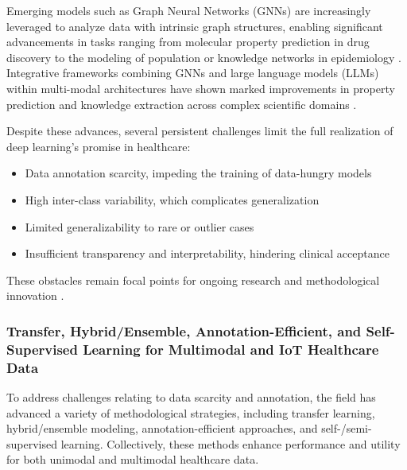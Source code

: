Emerging models such as Graph Neural Networks (GNNs) are increasingly leveraged to analyze data with intrinsic graph structures, enabling significant advancements in tasks ranging from molecular property prediction in drug discovery to the modeling of population or knowledge networks in epidemiology \cite{ref33, ref35, ref57}. Integrative frameworks combining GNNs and large language models (LLMs) within multi-modal architectures have shown marked improvements in property prediction and knowledge extraction across complex scientific domains \cite{ref33}.

Despite these advances, several persistent challenges limit the full realization of deep learning’s promise in healthcare:
\begin{itemize}
    \item Data annotation scarcity, impeding the training of data-hungry models
    \item High inter-class variability, which complicates generalization
    \item Limited generalizability to rare or outlier cases
    \item Insufficient transparency and interpretability, hindering clinical acceptance
\end{itemize}
These obstacles remain focal points for ongoing research and methodological innovation \cite{ref30, ref41, ref49, ref53, ref54, ref56, ref65, ref71}.

\subsubsection{Transfer, Hybrid/Ensemble, Annotation-Efficient, and Self-Supervised Learning for Multimodal and IoT Healthcare Data}

To address challenges relating to data scarcity and annotation, the field has advanced a variety of methodological strategies, including transfer learning, hybrid/ensemble modeling, annotation-efficient approaches, and self-/semi-supervised learning. Collectively, these methods enhance performance and utility for both unimodal and multimodal healthcare data.

